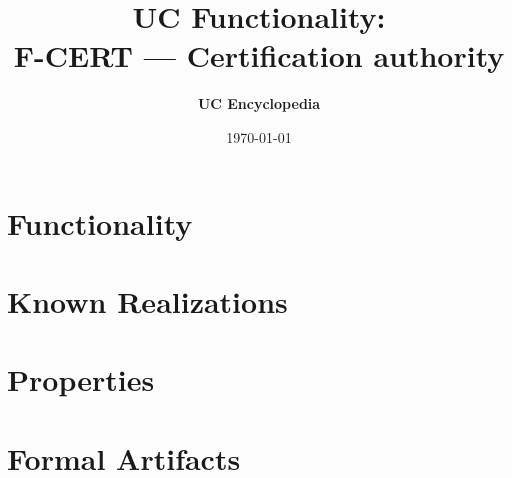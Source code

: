 \documentclass[11pt,a4paper]{article}
\title{\textbf{\Large UC Functionality:}\\[0.2em] \Large F-CERT --- Certification authority}
\author{\textbf{UC Encyclopedia}}
\date{\today}
\newtheorem{functionality}{Functionality}
\begin{document}
\maketitle

\begin{abstract}
\end{abstract}

\section{Functionality}

%

\section{Known Realizations}


\section{Properties}


\section{Formal Artifacts}

\end{document}
